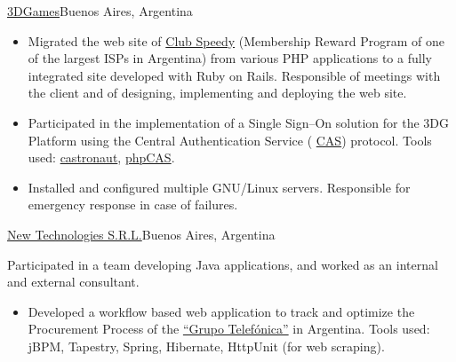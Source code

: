 \documentclass[11pt,a4paper,sans]{moderncv}
\newcommand\weblink[2] {{\color{href} \href{#1}{#2}}}
\begin{document}
%
{\weblink{http://www.3dgames.com.ar}{3DGames}}{Buenos Aires, Argentina}{}{%
\begin{itemize}
  \item Migrated the web site of \weblink{http://club.speedy.com.ar}{Club
    Speedy} (Membership Reward Program of one of the largest ISPs in Argentina)
    from various PHP applications to a fully integrated site developed with
    Ruby on Rails. Responsible of meetings with the client and of designing,
    implementing and deploying the web site.
  \item Participated in the implementation of a Single Sign--On solution for
    the 3DG Platform using the Central Authentication Service
    (\weblink{http://en.wikipedia.org/wiki/Central_Authentication_Service}{CAS})
    protocol. Tools used:
    \weblink{https://github.com/relevance/castronaut}{castronaut},
    \weblink{https://wiki.jasig.org/display/CASC/phpCAS}{phpCAS}.
  \item Installed and configured multiple GNU/Linux servers. Responsible for
    emergency response in case of failures.
\end{itemize}
}
%
{\weblink{http://www.newtechnologies.com.ar}{New Technologies S.R.L.}}{Buenos
Aires, Argentina}{}{%
Participated in a team developing Java applications, and
worked as an internal and external consultant.
\begin{itemize}
  \item Developed a workflow based web application to track and optimize the
    Procurement Process of the \weblink{http://www.telefonica.com/}{``Grupo
    Telefónica''} in Argentina.  Tools used: jBPM, Tapestry, Spring, Hibernate,
    HttpUnit (for web scraping).
\end{itemize}
}

\end{document}
